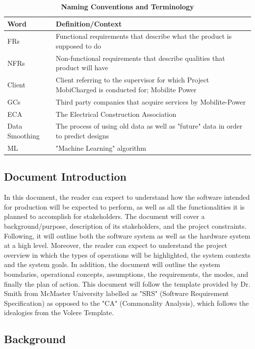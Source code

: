 \documentclass[12pt, titlepage]{article}
\begin{document}
\begin{table}[H]
\caption{\bf Naming Conventions and Terminology}
\begin{tabular}{ |p{6cm}|p{8cm}|  } 
 \hline
\bf Word & \bf Definition/Context\\
 \hline
 FRs & Functional requirements that describe what the product is supposed to do\\
 \hline
NFRs & Non-functional requirements that describe qualities that product will have\\
 \hline
 Client & Client referring to the supervisor for which Project MobiCharged is conducted for; Mobilite Power\\
 \hline
GCs & Third party companies that acquire services by Mobilite-Power\\
  \hline
ECA & The Electrical Construction Association\\
\hline
Data Smoothing & The process of using old data as well as "future" data in order to predict designs\\
\hline
ML & "Machine Learning" algorithm\\
\hline
\end{tabular}
\end{table}

\subsection{Document Introduction}
In this document, the reader can expect to understand how the software intended for production will be expected to perform, as well as all the functionalities it is planned to accomplish for stakeholders. The document will cover a background/purpose, description of its stakeholders, and the project constraints. Following, it will outline both the software system as well as the hardware system at a high level. Moreover, the reader can expect to understand the project overview in which the types of operations will be highlighted, the system contexts and the system goals. In addition, the document will outline the system boundaries, operational concepts, assumptions, the requirements, the modes, and finally the plan of action. This document will follow the template provided by Dr. Smith from McMaster University labelled as "SRS" (Software Requirement Specification) as opposed to the "CA" (Commonality Analysis), which follows the idealogies from the Volere Template.

\subsection{Background}
\end{document}
